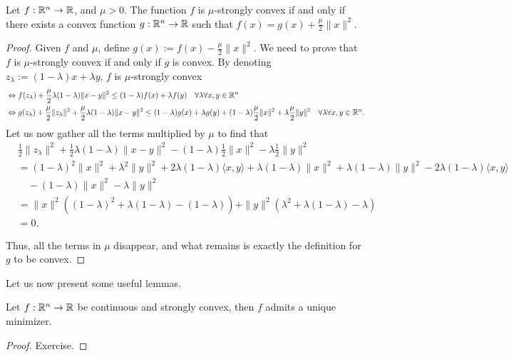 \documentclass[10pt,a4paper]{article}
\begin{document}
\begin{lemma}
	Let $f : \mathbb{R}^n \to \mathbb{R}$, and $\mu > 0$. The function $f$ is $\mu$-strongly convex if and only if there exists a convex function $g : \mathbb{R}^n \to \mathbb{R}$ such that $f(x) = g(x) + \frac{\mu}{2}\|x\|^2$.
\end{lemma} 
\begin{proof}
	Given $f$ and $\mu$, define $g(x) := f(x) - \frac{\mu}{2}\|x\|^2$. We need to prove that $f$ is $\mu$-strongly convex if and only if $g$ is convex. By denoting $z_\lambda := (1-\lambda)x + \lambda y$,  $f$ is $\mu$-strongly convex
	\begin{align*}
		&\Leftrightarrow f(z_\lambda) + \frac{\mu}{2}\lambda(1-\lambda)\|x - y\|^2 \leq (1-\lambda)f(x) + \lambda f(y) \quad \forall \lambda \forall x, y\in \mathbb{R}^n \\
		&\Leftrightarrow g(z_\lambda) + \frac{\mu}{2}\|z_\lambda\|^2 + \frac{\mu}{2}\lambda(1-\lambda)\|x - y\|^2 \leq (1-\lambda)g(x) + \lambda g(y) + (1-\lambda)\frac{\mu}{2}\|x\|^2 + \lambda\frac{\mu}{2}\|y\|^2 \quad \forall \lambda \forall x, y\in \mathbb{R}^n.
	\end{align*}
	Let us now gather all the terms multiplied by $\mu$ to find that
	\begin{align*}
		&\frac{1}{2}\|z_\lambda\|^2 + \frac{1}{2}\lambda(1-\lambda)\|x - y\|^2 - (1-\lambda)\frac{1}{2}\|x\|^2 - \lambda\frac{1}{2}\|y\|^2 \\
		&= (1-\lambda)^2\|x\|^2 + \lambda^2\|y\|^2 + 2\lambda(1-\lambda)\langle x, y \rangle + \lambda(1-\lambda)\|x\|^2 + \lambda(1-\lambda)\|y\|^2 - 2\lambda(1-\lambda)\langle x, y \rangle \\
		&\quad - (1-\lambda)\|x\|^2 - \lambda\|y\|^2 \\
		&= \|x\|^2\left((1-\lambda)^2 + \lambda(1-\lambda) - (1-\lambda)\right) + \|y\|^2\left(\lambda^2 + \lambda(1-\lambda) - \lambda\right) \\
		&= 0.
	\end{align*}
	
	\noindent Thus, all the terms in $\mu$ disappear, and what remains is exactly the definition for $g$ to be convex.
\end{proof}

\noindent Let us now present some useful lemmas. 
\begin{lemma}
	Let $f : \mathbb{R}^n \to \mathbb{R}$ be continuous and strongly convex, then $f$ admits a unique minimizer.
\end{lemma}
\begin{proof}
	Exercise. 
\end{proof}
\end{document}
